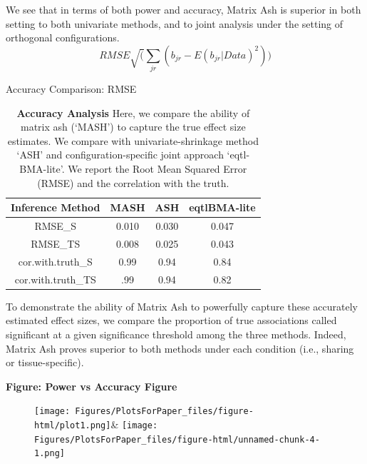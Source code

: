 We see that in terms of both power and accuracy, Matrix Ash is superior in both setting to both univariate methods, and to joint analysis under the setting of orthogonal configurations.
\begin{equation}
RMSE \sqrt(\sum_{jr}(b_{jr}-E(b_{jr}|Data)^2))
\end{equation}
\begin{table}[ht]
\caption{Accuracy Comparison: RMSE}
\centering
\begin{tabular}{c c c c}
\hline\hline
Inference Method & MASH & ASH & eqtlBMA-lite \\ [0.5ex] %
\hline
RMSE_{S}&0.010&0.030&0.047\\
RMSE_{TS}&0.008& 0.025&0.043 \\%
cor.with.truth_{S}&0.99&0.94&0.84\\
cor.with.truth_{TS}&.99&0.94&0.82\\
\hline
\end{tabular}
\label{table:RMSE}
\caption{\textbf{Accuracy Analysis} Here, we compare the ability of matrix ash (`MASH') to capture the true effect size estimates. We compare with univariate-shrinkage method `ASH' and configuration-specific joint approach `eqtl-BMA-lite'. We report the Root Mean Squared Error (RMSE) and the correlation with the truth.}
\end{table}

To demonstrate the ability of Matrix Ash to powerfully capture these accurately estimated effect sizes, we compare the proportion of true associations called significant at a given significance threshold among the three methods. Indeed, Matrix Ash  proves superior to both methods under each condition (i.e., sharing or tissue-specific). \newline


\textbf{Figure: Power vs Accuracy Figure}
\begin{figure}[h]
\texttt{[image: Figures/PlotsForPaper\_files/figure-html/plot1.png]}&
\texttt{[image: Figures/PlotsForPaper\_files/figure-html/unnamed-chunk-4-1.png]}
\end{figure}\newline

